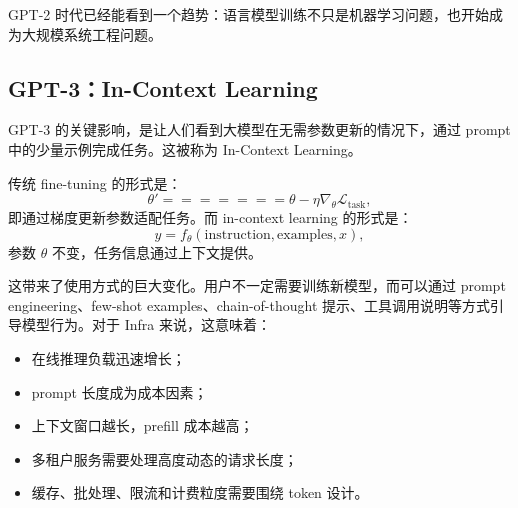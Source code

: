 GPT-2 时代已经能看到一个趋势：语言模型训练不只是机器学习问题，也开始成为大规模系统工程问题。

\subsection{GPT-3：In-Context Learning}
\label{subsec:gpt3-in-context-learning}

GPT-3 的关键影响，是让人们看到大模型在无需参数更新的情况下，通过 prompt 中的少量示例完成任务。这被称为 In-Context Learning。

传统 fine-tuning 的形式是：
\[
\theta'
=======

\theta-\eta\nabla_{\theta}\mathcal{L}_{\mathrm{task}},
\]
即通过梯度更新参数适配任务。而 in-context learning 的形式是：
\[
y
=

f_{\theta}
(
\text{instruction},
\text{examples},
x
),
\]
参数 $\theta$ 不变，任务信息通过上下文提供。

这带来了使用方式的巨大变化。用户不一定需要训练新模型，而可以通过 prompt engineering、few-shot examples、chain-of-thought 提示、工具调用说明等方式引导模型行为。对于 Infra 来说，这意味着：

\begin{itemize}
\item 在线推理负载迅速增长；
\item prompt 长度成为成本因素；
\item 上下文窗口越长，prefill 成本越高；
\item 多租户服务需要处理高度动态的请求长度；
\item 缓存、批处理、限流和计费粒度需要围绕 token 设计。
\end{itemize}

